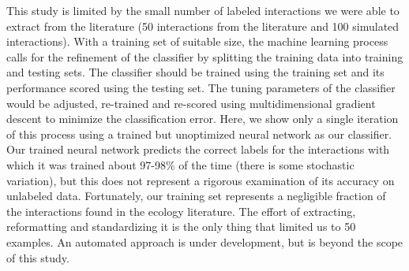 

This study is limited by the small number of labeled interactions we were able to extract from the literature (50 interactions from the literature and 100 simulated interactions). With a training set of suitable size, the machine learning process calls for the refinement of the classifier by splitting the training data into training and testing sets. The classifier should be trained using the training set and its performance scored using the testing set. The tuning parameters of the classifier would be adjusted, re-trained and re-scored using multidimensional gradient descent to minimize the classification error. Here, we show only a single iteration of this process using a trained but unoptimized neural network as our classifier. Our trained neural network predicts the correct labels for the interactions with which it was trained about 97-98\% of the time (there is some stochastic variation), but this does not represent a rigorous examination of its accuracy on unlabeled data. Fortunately, our training set represents a negligible fraction of the interactions found in the ecology literature. The effort of extracting, reformatting and standardizing it is the only thing that limited us to 50 examples. An automated approach is under development, but is beyond the scope of this study.